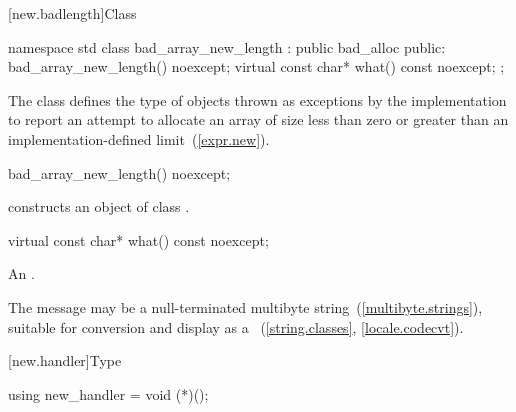 %
[new.badlength]{Class }

\begin{codeblock}
namespace std {
  class bad_array_new_length : public bad_alloc {
  public:
    bad_array_new_length() noexcept;
    virtual const char* what() const noexcept;
  };
}
\end{codeblock}

\pnum
The class  defines the type of objects thrown as
exceptions by the implementation to report an attempt to allocate an array of size
less than zero or
greater than an implementation-defined limit~(\ref{expr.new}).

%
\begin{itemdecl}
bad_array_new_length() noexcept;
\end{itemdecl}

\begin{itemdescr}
\pnum
\effects constructs an object of class .
\end{itemdescr}

%
\begin{itemdecl}
virtual const char* what() const noexcept;
\end{itemdecl}

\begin{itemdescr}
\pnum
\returns
{}%
An  \ntbs.

\pnum
\remarks
The message may be a null-terminated multibyte string~(\ref{multibyte.strings}),
suitable for conversion and display as a
~(\ref{string.classes}, \ref{locale.codecvt}).
\end{itemdescr}

[new.handler]{Type }

%
\begin{itemdecl}
using new_handler = void (*)();
\end{itemdecl}

